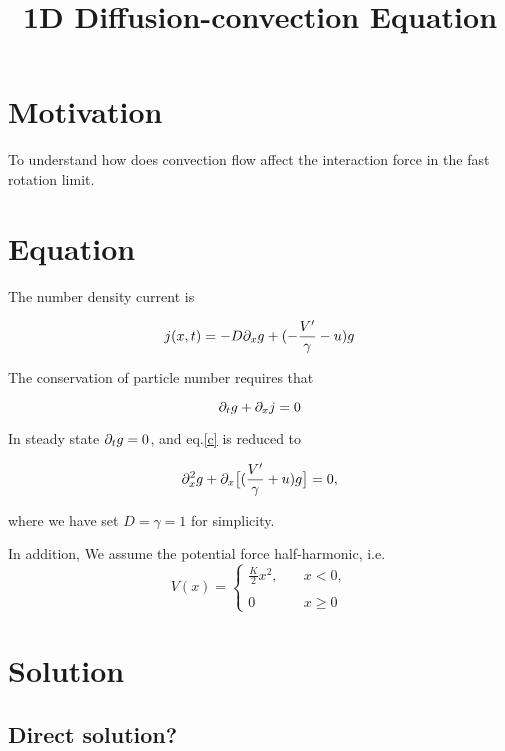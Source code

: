 \documentclass{../Templetes/1c}
\begin{document}
\title {1D Diffusion-convection Equation} 
\maketitle



\section{Motivation}
To understand how does convection flow affect the interaction force in the fast rotation limit.



\section{Equation}
The number density current is 

\begin{equation}
j(x,t)=-D\partial_x g+(-\frac{V'}{\gamma}-u)g
\end{equation}

The conservation of particle number requires that

\begin{equation} \label{c}
\partial_t g+ \partial_x j=0
\end{equation}

In steady state $\partial_tg=0$, and eq.\eqref{c} is reduced to

\begin{equation} \label{s}
\partial_x^2 g+\partial_x\big[(\frac{V'}{\gamma}+u)g\big]=0,
\end{equation}  

where we have set $D=\gamma=1$ for simplicity. 

In addition, We assume the potential force half-harmonic, i.e. 
\begin{equation}
    V(x)=
   \begin{cases}
    \frac{K}{2}x^2, &\quad x<0, \\
    & \\
    0 & \quad x\geq 0 
   \end{cases}
  \end{equation}

\section{Solution}




\subsection{Direct solution?}
\end{document}
